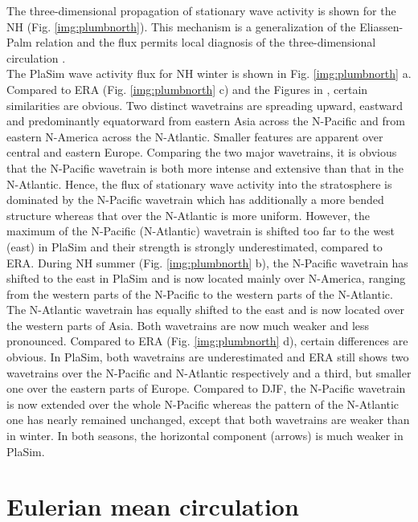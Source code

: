 \documentclass[12pt,a4paper,twoside,openright,headinclude,liststotoc,bibtotoc]{scrreprt}
\begin{document}
The three-dimensional propagation of stationary wave activity is shown for the NH (Fig. \ref{img:plumbnorth}). This mechanism is a generalization of the Eliassen-Palm relation \citep{Plumb1984} and the flux permits local diagnosis of the three-dimensional circulation \citep{Plumb1984}.\\
The PlaSim wave activity flux for NH winter is shown in Fig. \ref{img:plumbnorth} a. Compared to ERA (Fig. \ref{img:plumbnorth} c) and the Figures in \citet[p. 225]{Plumb1984}, certain similarities are obvious. Two distinct wavetrains are spreading upward, eastward and predominantly equatorward from eastern Asia across the N-Pacific and from eastern N-America across the N-Atlantic. Smaller features are apparent over central and eastern Europe. Comparing the two major wavetrains, it is obvious that the N-Pacific wavetrain is both more intense and extensive than that in the N-Atlantic. Hence, the flux of stationary wave activity into the stratosphere is dominated by the N-Pacific wavetrain which has additionally a more bended structure whereas that over the N-Atlantic is more uniform. However, the maximum of the N-Pacific (N-Atlantic) wavetrain is shifted too far to the west (east) in PlaSim and their strength is strongly underestimated, compared to ERA. During NH summer (Fig. \ref{img:plumbnorth} b), the N-Pacific wavetrain has shifted to the east in PlaSim and is now located mainly over N-America, ranging from the western parts of the N-Pacific to the western parts of the N-Atlantic. The N-Atlantic wavetrain has equally shifted to the east and is now located over the western parts of Asia. Both wavetrains are now much weaker and less pronounced. Compared to ERA (Fig. \ref{img:plumbnorth} d), certain differences are obvious. In PlaSim, both wavetrains are underestimated and ERA still shows two wavetrains over the N-Pacific and N-Atlantic respectively and a third, but smaller one over the eastern parts of Europe. Compared to DJF, the N-Pacific wavetrain is now extended over the whole N-Pacific whereas the pattern of the N-Atlantic one has nearly remained unchanged, except that both wavetrains are weaker than in winter. In both seasons, the horizontal component (arrows) is much weaker in PlaSim. 



\vspace{-0.4cm}
\section{Eulerian mean circulation}
\vspace{-0.4cm}
\end{document}
